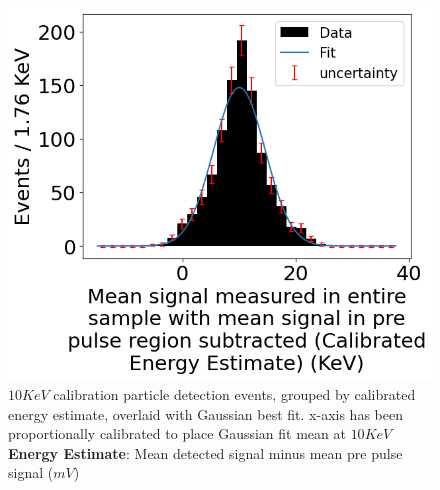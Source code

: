 \begin{figure}[H]
\begin{minipage}[t]{0.45\linewidth}
\begin{center}
			\includegraphics[width=\textwidth]{figures/area2--calibrated.png}
			\caption{
                $10\unit{KeV}$ calibration particle detection events, grouped by calibrated energy estimate, overlaid with Gaussian best fit. x-axis has been proportionally calibrated to place Gaussian fit mean at $10\unit{KeV}$ \\
                \textbf{Energy Estimate}: Mean detected signal minus mean pre pulse signal  ($\unit{mV}$)
            }
		\end{center}
	\end{minipage}
\end{figure}


